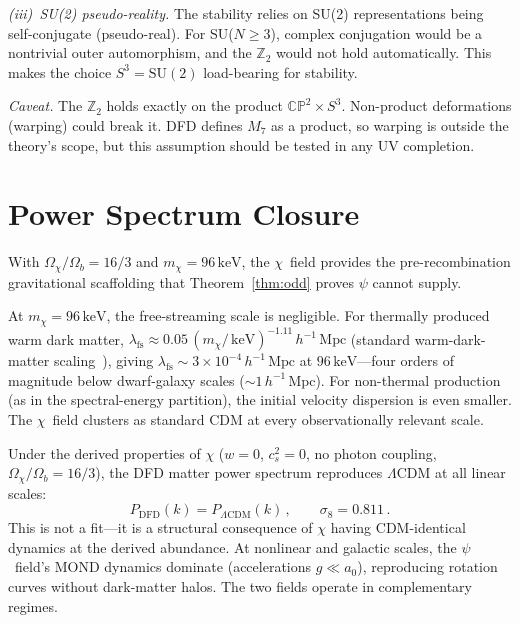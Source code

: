 \documentclass[aps,prd,twocolumn,superscriptaddress,showpacs,floatfix,nofootinbib]{revtex4-2}
\theoremstyle{definition}
\theoremstyle{remark}
\newcommand{\CP}{\mathbb{CP}}
\newcommand{\Sph}{S}
\newcommand{\keV}{\,\mathrm{keV}}
\newcommand{\Mpc}{\,\mathrm{Mpc}}
\newcommand{\azero}{a_0}
\newcommand{\LCDM}{\Lambda\mathrm{CDM}}
\begin{document}
\emph{(iii)~SU(2) pseudo-reality.} The stability relies on
SU(2) representations being self-conjugate (pseudo-real).
For SU($N\geq 3$), complex conjugation would be a nontrivial
outer automorphism, and the $\mathbb{Z}_2$ would not hold
automatically. This makes the choice $\Sph^3 = \mathrm{SU}(2)$
load-bearing for stability.

\emph{Caveat.} The $\mathbb{Z}_2$ holds exactly on the
product $\CP^2\times\Sph^3$. Non-product deformations
(warping) could break it. DFD defines $M_7$ as a product,
so warping is outside the theory's scope, but this
assumption should be tested in any UV completion.

\section{Power Spectrum Closure}
\label{sec:pk}

With $\Omega_\chi/\Omega_b = 16/3$ and $m_\chi = 96\keV$,
the $\chi$~field provides the pre-recombination
gravitational scaffolding that Theorem~\ref{thm:odd}
proves $\psi$ cannot supply.

At $m_\chi = 96\keV$, the free-streaming scale is
negligible. For thermally produced warm dark matter,
$\lambda_{\mathrm{fs}} \approx 0.05\,(m_\chi/\keV)^{-1.11}
\,h^{-1}\Mpc$ (standard warm-dark-matter
scaling~\cite{Viel2005}), giving
$\lambda_{\mathrm{fs}} \sim 3\times 10^{-4}\,h^{-1}\Mpc$
at $96\keV$---four orders of magnitude below dwarf-galaxy
scales (${\sim}1\,h^{-1}\Mpc$). For non-thermal production
(as in the spectral-energy partition), the initial velocity
dispersion is even smaller. The $\chi$~field clusters as
standard CDM at every observationally relevant scale.

Under the derived properties of $\chi$
($w=0$, $c_s^2=0$, no photon coupling,
$\Omega_\chi/\Omega_b = 16/3$), the DFD matter power
spectrum reproduces $\LCDM$ at all linear scales:
\begin{equation}
P_{\mathrm{DFD}}(k) = P_{\LCDM}(k)\,,\qquad
\sigma_8 = 0.811\,.
\end{equation}
This is not a fit---it is a structural consequence of
$\chi$ having CDM-identical dynamics at the derived
abundance. At nonlinear and
galactic scales, the $\psi$~field's MOND dynamics dominate
(accelerations $g\ll\azero$), reproducing rotation curves
without dark-matter halos. The two fields operate in
complementary regimes.
\end{document}
